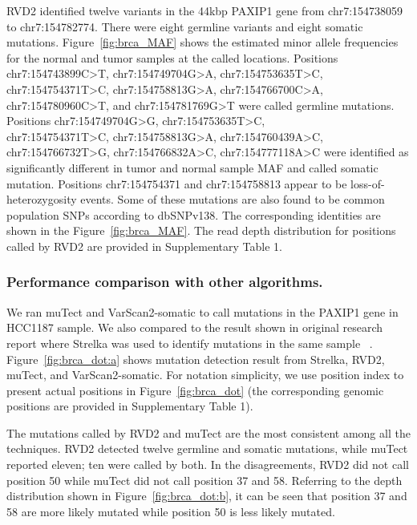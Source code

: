 \documentclass{bioinfo}
\begin{document}
RVD2 identified twelve variants in the 44kbp PAXIP1 gene from chr7:154738059 to chr7:154782774. There were eight germline variants and eight somatic mutations. %
Figure~\ref{fig:brca_MAF} shows the estimated minor allele frequencies for the normal and tumor samples at the called locations. Positions chr7:154743899C\textgreater T, chr7:154749704G\textgreater A, chr7:154753635T\textgreater C, chr7:154754371T\textgreater C, chr7:154758813G\textgreater A, chr7:154766700C\textgreater A, chr7:154780960C\textgreater T, and chr7:154781769G\textgreater T were called germline mutations. Positions chr7:154749704G\textgreater G, chr7:154753635T\textgreater C, \\ chr7:154754371T\textgreater C, chr7:154758813G\textgreater A, chr7:154760439A\textgreater C, chr7:154766732T\textgreater G,  chr7:154766832A\textgreater C, chr7:154777118A\textgreater C were identified as significantly different in tumor and normal sample MAF and called somatic mutation. Positions chr7:154754371 and chr7:154758813 appear to be loss-of-heterozygosity events. Some of these mutations are also found to be common population SNPs according to dbSNPv138. The corresponding identities are shown in the Figure~\ref{fig:brca_MAF}. The read depth distribution for positions called by RVD2 are provided in Supplementary Table 1. 

\subsubsection{Performance comparison with other algorithms.}

We ran muTect and VarScan2-somatic to call mutations in the PAXIP1 gene in HCC1187 sample. We also compared to the result shown in original research report where Strelka was used to identify mutations in the same sample ~\citep{hcc1187techreport}. Figure~\ref{fig:brca_dot:a} shows mutation detection result from Strelka, RVD2, muTect, and VarScan2-somatic. For notation simplicity, we use position index to present actual positions in Figure~\ref{fig:brca_dot} (the corresponding genomic positions are provided in Supplementary Table 1). 

The mutations called by RVD2 and muTect are the most consistent among all the techniques. RVD2 detected twelve germline and somatic mutations, while muTect reported eleven; ten were called by both. In the disagreements, RVD2 did not call position 50 while muTect did not call position 37 and 58. Referring to the depth distribution shown in Figure~\ref{fig:brca_dot:b}, it can be seen that position 37 and 58 are more likely mutated while position 50 is less likely mutated. 
\end{document}

